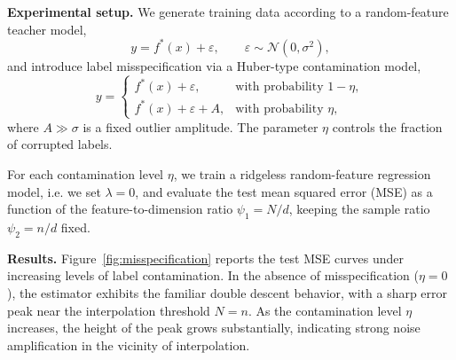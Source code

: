 \documentclass[12pt, english, oneside, a4paper]{article}
\begin{document}
\textbf{Experimental setup.}
We generate training data according to a random-feature teacher model,
\[
y = f^{*}(x) + \varepsilon,
\qquad \varepsilon \sim \mathcal N(0,\sigma^2),
\]
and introduce label misspecification via a Huber-type contamination model,
\begin{equation}
y =
\begin{cases}
f^*(x) + \varepsilon, & \text{with probability } 1-\eta, \\
f^*(x) + \varepsilon + A, & \text{with probability } \eta,
\end{cases}
\label{eq:huber-contamination}
\end{equation}
where $A \gg \sigma$ is a fixed outlier amplitude.
The parameter $\eta$ controls the fraction of corrupted labels.

For each contamination level $\eta$, we train a ridgeless random-feature regression model, i.e. we set $\lambda=0$, and evaluate the test mean squared error (MSE) as a function of the feature-to-dimension ratio $\psi_1 = N/d$, keeping the sample ratio $\psi_2 = n/d$ fixed.

\textbf{Results.}
Figure~\ref{fig:misspecification} reports the test MSE curves under increasing levels of label contamination.
In the absence of misspecification ($\eta=0$), the estimator exhibits the familiar double descent behavior, with a sharp error peak near the interpolation threshold $N=n$. As the contamination level $\eta$ increases, the height of the peak grows substantially, indicating strong noise amplification in the vicinity of interpolation.
\end{document}
